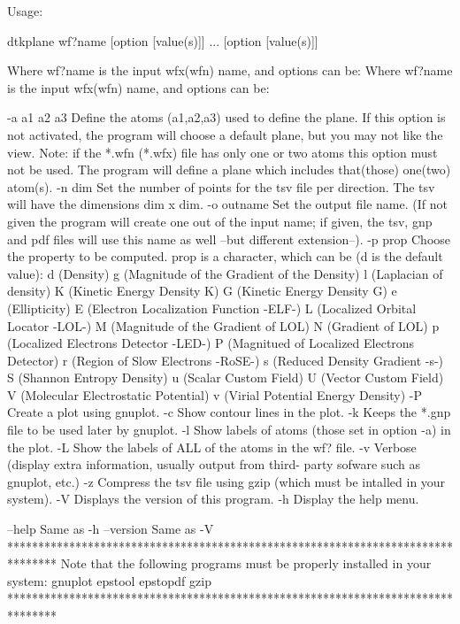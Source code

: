 Usage:

	dtkplane wf?name [option [value(s)]] ... [option [value(s)]]

Where wf?name is the input wfx(wfn) name, and options can be:
Where wf?name is the input wfx(wfn) name, and options can be:

  -a a1 a2 a3	Define the atoms  (a1,a2,a3) used to define the plane.
            	  If this option is not activated, the program will 
            	  choose a default plane, but you may not like the view.
            	  Note: if the *.wfn (*.wfx) file has only one or two atoms
            	  this option must not be used. The program will define
            	  a plane which includes that(those) one(two) atom(s).
  -n  dim   	Set the number of points for the tsv file per direction.
            	  The tsv will have the dimensions dim x dim.
  -o outname	Set the output file name.
            	  (If not given the program will create one out of
            	  the input name; if given, the tsv, gnp and pdf files will
            	  use this name as well --but different extension--).
  -p prop	Choose the property to be computed. prop is a character,
         	  which can be (d is the default value): 
         		d (Density)
         		g (Magnitude of the Gradient of the Density)
         		l (Laplacian of density)
         		K (Kinetic Energy Density K)
         		G (Kinetic Energy Density G)
         		e (Ellipticity)
         		E (Electron Localization Function -ELF-)
         		L (Localized Orbital Locator -LOL-)
         		M (Magnitude of the Gradient of LOL)
         		N (Gradient of LOL)
         		p (Localized Electrons Detector -LED-)
         		P (Magnitued of Localized Electrons Detector)
         		r (Region of Slow Electrons -RoSE-)
         		s (Reduced Density Gradient -s-)
         		S (Shannon Entropy Density)
         		u (Scalar Custom Field)
         		U (Vector Custom Field)
         		V (Molecular Electrostatic Potential)
         		v (Virial Potential Energy Density)
  -P     	Create a plot using gnuplot.
  -c     	Show contour lines in the plot.
  -k     	Keeps the *.gnp file to be used later by gnuplot.
  -l     	Show labels of atoms (those set in option -a) in the plot.
  -L     	Show the labels of ALL of the atoms in the wf? file.
  -v     	Verbose (display extra information, usually output from third-
         	  party sofware such as gnuplot, etc.)
  -z     	Compress the tsv file using gzip (which must be intalled
         	   in your system).
  -V        	Displays the version of this program.
  -h     	Display the help menu.

  --help    		Same as -h
  --version 		Same as -V
********************************************************************************
  Note that the following programs must be properly installed in your system:
                                    gnuplot
                                    epstool
                                    epstopdf
                                      gzip
********************************************************************************
